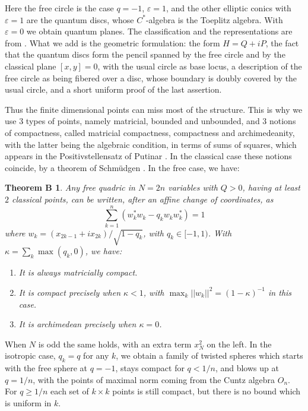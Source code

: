 \documentclass[11pt]{amsart}
\newtheorem*{theoremb}{Theorem B}
\theoremstyle{definition}
\begin{document}
Here the free circle is the case $q=-1$, $\varepsilon=1$, and the other elliptic conics with $\varepsilon=1$ are the quantum discs, whose $C^*$-algebra is the Toeplitz algebra. With $\varepsilon=0$ we obtain quantum planes. The classification and the representations are from \cite{os1}. What we add is the geometric formulation: the form $H=Q+iP$, the fact that the quantum discs form the pencil spanned by the free circle and by the classical plane $[x,y]=0$, with the usual circle as base locus, a description of the free circle as being fibered over a disc, whose boundary is doubly covered by the usual circle, and a short uniform proof of the last assertion.

Thus the finite dimensional points can miss most of the structure. This is why we use 3 types of points, namely matricial, bounded and unbounded, and 3 notions of compactness, called matricial compactness, compactness and archimedeanity, with the latter being the algebraic condition, in terms of sums of squares, which appears in the Positivstellensatz of Putinar \cite{put}. In the classical case these notions coincide, by a theorem of Schm\"udgen \cite{sc1}. In the free case, we have:

\begin{theoremb}
Any free quadric in $N=2n$ variables with $Q>0$, having at least $2$ classical points, can be written, after an affine change of coordinates, as
$$\sum_{k=1}^n\left(w_k^*w_k-q_kw_kw_k^*\right)=1$$
where $w_k=(x_{2k-1}+ix_{2k})/\sqrt{1-q_k}$, with $q_k\in[-1,1)$. With $\kappa=\sum_k\max(q_k,0)$, we have:
\begin{enumerate}
\item It is always matricially compact.

\item It is compact precisely when $\kappa<1$, with $\max_k||w_k||^2=(1-\kappa)^{-1}$ in this case.

\item It is archimedean precisely when $\kappa=0$.
\end{enumerate}
\end{theoremb}

When $N$ is odd the same holds, with an extra term $x_N^2$ on the left. In the isotropic case, $q_k=q$ for any $k$, we obtain a family of twisted spheres which starts with the free sphere at $q=-1$, stays compact for $q<1/n$, and blows up at $q=1/n$, with the points of maximal norm coming from the Cuntz algebra $O_n$. For $q\geq1/n$ each set of $k\times k$ points is still compact, but there is no bound which is uniform in $k$.
\end{document}
